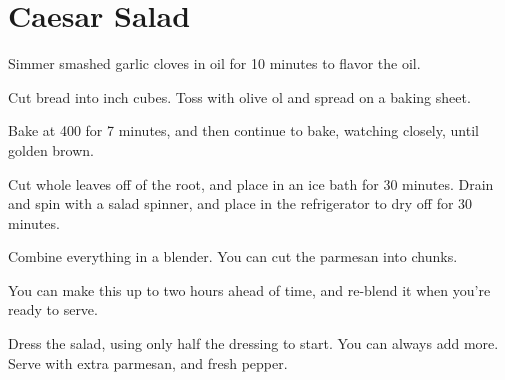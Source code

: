 \section{Caesar Salad}
\begin{recipe}



Simmer smashed garlic cloves in oil for 10 minutes to flavor the oil.

Cut bread into  inch cubes. Toss with olive ol and spread on a baking sheet.

Bake at 400\degree{} for 7 minutes, and then continue to bake, watching closely, until golden brown.


Cut whole leaves off of the root, and place in an ice bath for 30 minutes. Drain and spin with a salad spinner, and place in the refrigerator to dry off for 30 minutes.


Combine everything in a blender. You can cut the parmesan into chunks. 

You can make this up to two hours ahead of time, and re-blend it when you're ready to serve. 

Dress the salad, using only half the dressing to start. You can always add more. Serve with extra parmesan, and fresh pepper. 

\end{recipe}
